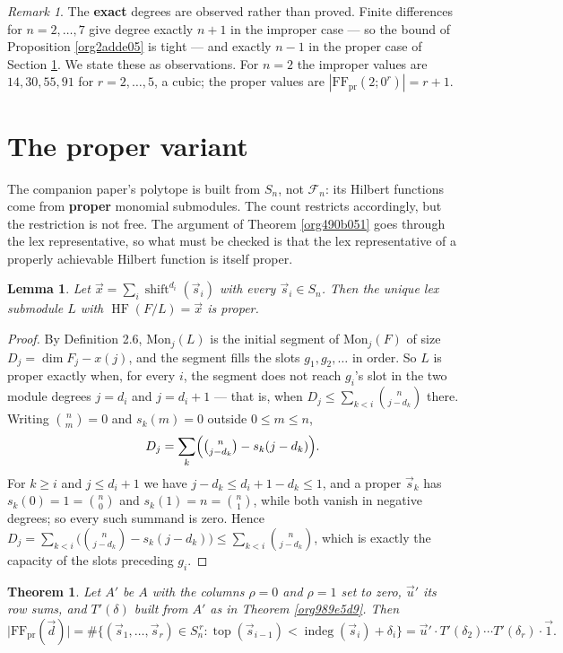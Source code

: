 \documentclass[11pt, a4paper, abstract=yes]{scrartcl}
\theoremstyle{definition}
\theoremstyle{remark}
\newtheorem{remark}[definition]{Remark}
\theoremstyle{plain}
\newtheorem{lemma}[definition]{Lemma}
\newtheorem{theorem}[definition]{Theorem}
\newcommand{\vek}[1]{\boldsymbol{#1}}
\newcommand{\shift}{\operatorname{shift}}
\newcommand{\indeg}{\operatorname{indeg}}
\newcommand{\tp}{\operatorname{top}}
\newcommand{\HF}{\operatorname{HF}}
\renewcommand{\vek}[1]{\vec{#1}}
\begin{document}
\begin{remark}
The \textbf{exact} degrees are observed rather than proved. Finite differences for \(n=2,\dots,7\) give
degree exactly \(n+1\) in the improper case --- so the bound of Proposition \ref{org2adde05} is tight ---
and exactly \(n-1\) in the proper case of Section \ref{sec:orgb1f50e3}. We state these as observations. For
\(n=2\) the improper values are \(14,30,55,91\) for \(r=2,\dots,5\), a cubic; the proper values are
\(|\mathrm{FF}_{\mathrm{pr}}(2;0^r)|=r+1\).
\label{orgee21856}
\end{remark}
\section{The proper variant}
\label{sec:orgb1f50e3}
The companion paper's polytope is built from \(S_n\), not \(\mathcal F_n\): its Hilbert functions come
from \textbf{proper} monomial submodules. The count restricts accordingly, but the restriction is not free.
The argument of Theorem \ref{org490b051} goes through the lex representative, so what must be checked
is that the lex representative of a properly achievable Hilbert function is itself proper.

\begin{lemma}
Let \(\vek x=\sum_i\shift^{d_i}(\vek s_i)\) with every \(\vek s_i\in S_n\). Then the unique lex submodule
\(L\) with \(\HF(F/L)=\vek x\) is proper.
\label{orgb9a993b}
\end{lemma}

\begin{proof}
By Definition 2.6, \(\mathrm{Mon}_j(L)\) is the initial segment of \(\mathrm{Mon}_j(F)\) of size
\(D_j=\dim F_j-x(j)\), and the segment fills the slots \(g_1,g_2,\dots\) in order. So \(L\) is proper
exactly when, for every \(i\), the segment does not reach \(g_i\)'s slot in the two module degrees
\(j=d_i\) and \(j=d_i+1\) --- that is, when \(D_j\le\sum_{k<i}\binom n{j-d_k}\) there. Writing
\(\binom nm=0\) and \(s_k(m)=0\) outside \(0\le m\le n\),
\[
  D_j=\sum_k\Bigl(\tbinom n{j-d_k}-s_k(j-d_k)\Bigr).
\]
For \(k\ge i\) and \(j\le d_i+1\) we have \(j-d_k\le d_i+1-d_k\le1\), and a proper \(\vek s_k\) has
\(s_k(0)=1=\binom n0\) and \(s_k(1)=n=\binom n1\), while both vanish in negative degrees; so every
such summand is zero. Hence \(D_j=\sum_{k<i}\bigl(\binom n{j-d_k}-s_k(j-d_k)\bigr)\le
\sum_{k<i}\binom n{j-d_k}\), which is exactly the capacity of the slots preceding \(g_i\).
\end{proof}

\begin{theorem}
Let \(A'\) be \(A\) with the columns \(\rho=0\) and \(\rho=1\) set to zero, \(\vek u'\) its row sums, and
\(T'(\delta)\) built from \(A'\) as in Theorem \ref{org989e5d9}. Then
\[
  \lvert\mathrm{FF}_{\mathrm{pr}}(\vek d)\rvert
  =\#\bigl\lbrace(\vek s_1,\dots,\vek s_r)\in S_n^{\,r}:\tp(\vek s_{i-1})<\indeg(\vek s_i)+\delta_i\bigr\rbrace
  = \vek u'\cdot T'(\delta_2)\cdots T'(\delta_r)\cdot\vek 1 .
\]
\label{orge76c133}
\end{theorem}
\end{document}

